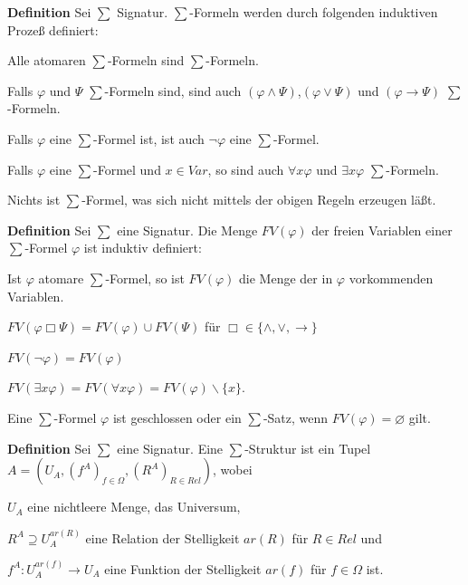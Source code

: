 \documentclass[a4paper]{article}
\renewcommand{\note}[2]{\begin{noteBox} \textbf{#1} #2 \end{noteBox}}
\begin{document}
\begin{multicols}{3}
  \note{Definition}{Sei $\sum$ Signatur. $\sum$-Formeln werden durch folgenden induktiven Prozeß definiert:
    \begin{enumerate*}
      \item Alle atomaren $\sum$-Formeln sind $\sum$-Formeln.
      \item Falls $\varphi$ und $\Psi$ $\sum$-Formeln sind, sind auch $(\varphi\wedge\Psi)$,$(\varphi\vee\Psi)$ und $(\varphi\rightarrow\Psi)$ $\sum$-Formeln.
      \item Falls $\varphi$ eine $\sum$-Formel ist, ist auch $\lnot\varphi$ eine $\sum$-Formel.
      \item Falls $\varphi$ eine $\sum$-Formel und $x\in Var$, so sind auch $\forall x\varphi$ und $\exists x\varphi$ $\sum$-Formeln.
      \item Nichts ist $\sum$-Formel, was sich nicht mittels der obigen Regeln erzeugen läßt.
    \end{enumerate*}
  }

  \note{Definition}{Sei $\sum$ eine Signatur. Die Menge $FV(\varphi)$ der freien Variablen einer $\sum$-Formel $\varphi$ ist induktiv definiert:
    \begin{itemize*}
      \item Ist $\varphi$ atomare $\sum$-Formel, so ist $FV(\varphi)$ die Menge der in $\varphi$ vorkommenden Variablen.
      \item $FV(\varphi\Box\Psi) =FV(\varphi)\cup FV(\Psi)$ für $\Box\in\{\wedge,\vee,\rightarrow\}$
      \item $FV(\lnot\varphi) =FV(\varphi)$
      \item $FV(\exists x\varphi) =FV(\forall x\varphi) =FV(\varphi)\backslash\{x\}$.
    \end{itemize*}
    Eine $\sum$-Formel $\varphi$ ist geschlossen oder ein $\sum$-Satz, wenn $FV(\varphi)=\varnothing$ gilt.}

  \note{Definition}{Sei $\sum$ eine Signatur. Eine $\sum$-Struktur ist ein Tupel $A=(U_A,(f^A)_{f\in\Omega},(R^A)_{R\in Rel})$, wobei
    \begin{itemize*}
      \item $U_A$ eine nichtleere Menge, das Universum,
      \item $R^A\supseteq U_A^{ar(R)}$ eine Relation der Stelligkeit $ar(R)$ für $R\in Rel$ und
      \item $f^A:U_A^{ar(f)}\rightarrow U_A$ eine Funktion der Stelligkeit $ar(f)$ für $f\in\Omega$ ist.
    \end{itemize*}
  }


\end{multicols}
\end{document}
